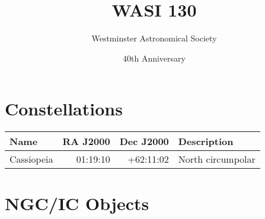 \documentclass[11pt]{article}
\date{40th Anniversary}
\author{Westminster Astronomical Society}
\title{WASI 130}
\begin{document}
\maketitle           %


\section*{Constellations}

\begin{tabular}{lrrl} \toprule
Name & RA J2000 & Dec J2000 & Description \\ \midrule
Cassiopeia & 01:19:10 & +62:11:02 & North circumpolar \\
\bottomrule
\end{tabular}

\section*{NGC/IC Objects}
\end{document}
